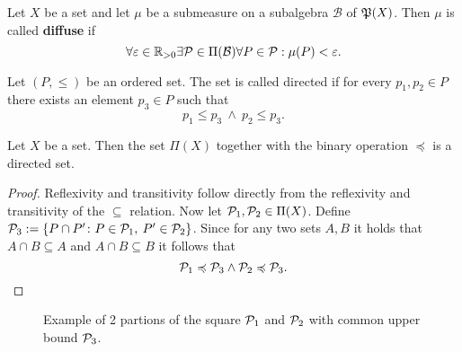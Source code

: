 \begin{defin}
  Let $X$ be a set and let $\mu$ be a submeasure on a subalgebra $\mathcal{B}$ of $\PowS(X)$. Then $\mu$ is called \textbf{diffuse} if
  \begin{equation*}
    \forall \varepsilon\in \R_{>0}\exists \P \in \Pi(\mathcal{B})\forall P \in \P: \mu(P) < \varepsilon.
  \end{equation*}
\end{defin}

\begin{defin}
  Let $(P, \leq)$ be an ordered set. The set is called directed if for every $p_1, p_2 \in P$ there exists an element $p_3 \in P$ such that
  \begin{equation*}
    p_1 \leq p_3 \: \land \: p_2 \leq p_3.
  \end{equation*}
\end{defin}

\begin{thm}\label{thm:algdirected}
  Let $X$ be a set. Then the set $\Pi(X)$ together with the binary operation $\preccurlyeq$ is a directed set.
\end{thm}

\begin{proof}
  Reflexivity and transitivity follow directly from the reflexivity and transitivity of the $\subseteq$ relation.
  Now let $\P_1, \P_2 \in \Pi(X)$. Define $\P_3 := \{ P \cap P' \colon P \in \P_1, \:P' \in \P_2 \}$.
  Since for any two sets $A, B$ it holds that $A \cap B \subseteq A$ and $A \cap B \subseteq B$ it follows that
  \begin{equation*}
    \P_1 \preccurlyeq \P_3 \land \P_2 \preccurlyeq \P_3.
  \end{equation*}
\end{proof}

\begin{figure}[ht!]
  \centering
  \caption{Example of 2 partions of the square $\P_1$ and $\P_2$ with common upper bound $\P_3$.}
\end{figure}


